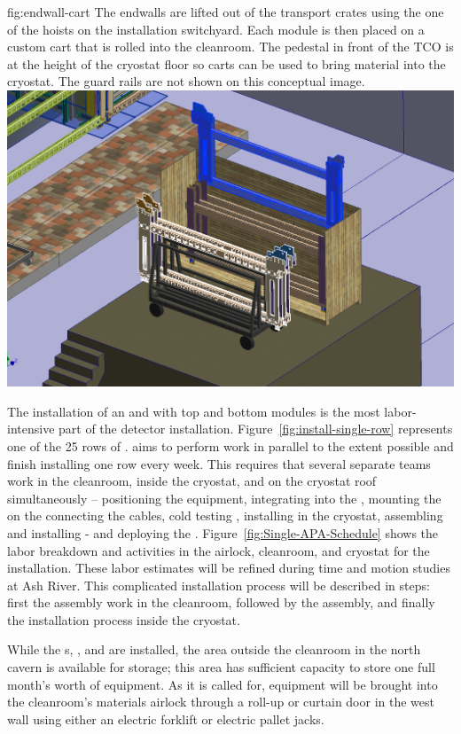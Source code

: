 \begin{dunefigure}{fig:endwall-cart}
  {The endwalls are lifted out of the transport crates using the one of the hoists on the installation switchyard. Each module is then placed on a custom cart that is rolled into the cleanroom. The pedestal in front of the TCO is at the height of the cryostat floor so carts can be used to bring material into the cryostat. The guard rails are not shown on this conceptual image.}
\includegraphics[width=.5\textwidth]{graphics/endwall-cart.png}
\end{dunefigure}




The installation of an  and   with top and bottom  modules is the most labor-intensive part of the detector installation. Figure~\ref{fig:install-single-row} represents one of the 25 rows of .   aims to perform work in parallel to the extent possible and finish installing one row every week. 
This requires that several separate teams work in the cleanroom, inside the cryostat, and on the cryostat roof simultaneously --  positioning the equipment, integrating  into the , mounting the   on the  connecting the cables, cold testing , installing  in the cryostat, assembling and installing - and deploying the .
Figure~\ref{fig:Single-APA-Schedule} shows the labor breakdown and activities in the airlock,  cleanroom, and cryostat for the  installation. These labor estimates will be refined during time and motion studies at Ash River. 
This complicated installation process will be described in steps: first the  assembly work in the cleanroom, followed by the  assembly, and finally the installation process inside the cryostat.

While the s, , and  are installed, the area outside the cleanroom in the north cavern is available for storage; this area has sufficient capacity to store one full month's worth of equipment. As it is called for, equipment will be brought into the cleanroom's materials airlock through a roll-up or curtain door in the west wall using either an electric forklift or electric pallet jacks.

